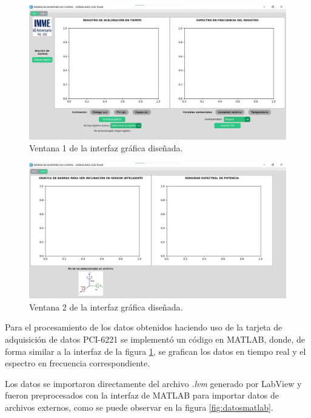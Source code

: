 \begin{figure}[H]
    \centering
    \includegraphics[width = \textwidth]{imagenes/cap3_resultados/Ensayos/GUI1.jpg}
    \caption{Ventana 1 de la interfaz gráfica diseñada.}
    \label{fig:interfaz1}
\end{figure}

\begin{figure}[H]
    \centering
    \includegraphics[width = \textwidth]{imagenes/cap3_resultados/Ensayos/GUI2.jpg}
    \caption{Ventana 2 de la interfaz gráfica diseñada.}
    \label{fig:interfaz2}
\end{figure}

Para el procesamiento de los datos obtenidos haciendo uso de la tarjeta de adquisición de datos PCI-6221 se implementó un código en MATLAB, donde, de forma similar a la interfaz de la figura \ref{fig:interfaz1}, se grafican los datos en tiempo real y el espectro en frecuencia correspondiente.

Los datos se importaron directamente del archivo \textit{.lvm} generado por LabView y fueron preprocesados con la interfaz de MATLAB para importar datos de archivos externos, como se puede observar en la figura \ref{fig:datosmatlab}.

